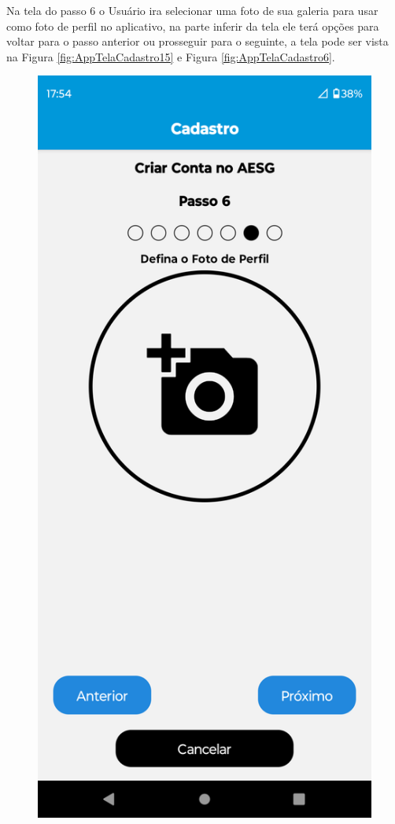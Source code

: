 \documentclass[
    12pt,                   %
    openright,              %
    oneside,                %
    a4paper,                %
    sumario=tradicional,    %
    english,                %
    brazil,                 %
    ]{abntex2}
\begin{document}
            \newpage
            Na tela do passo 6 o Usuário ira selecionar uma foto de sua galeria para usar como foto de perfil no aplicativo, na parte inferir da tela ele terá opções para voltar para o passo anterior ou prosseguir para o seguinte, a tela pode ser vista na Figura \ref{fig:AppTelaCadastro15} e Figura \ref{fig:AppTelaCadastro6}.
            \begin{figure}[!h]          
                \begin{minipage}{0.5\textwidth}
                    \centering
                    \includegraphics[width=0.8\linewidth]{Imagens/App Images User/AUCadastro15.png}

\end{minipage}
\end{figure}
\end{document}
